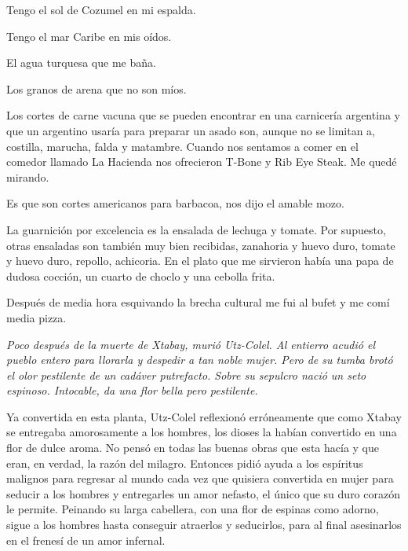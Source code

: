 \documentclass[12pt,twoside,openright,a5paper]{book}
\begin{document}
\vspace{0.5cm}

Tengo el sol de Cozumel en mi espalda.

Tengo el mar Caribe en mis oídos.

El agua turquesa que me baña.

Los granos de arena que no son míos.

\vspace{0.5cm}

\hrulefill\hspace{0.2cm} \decofourleft\decofourright \hspace{0.2cm} \hrulefill
\vspace{0.5cm}

Los cortes de carne vacuna que se pueden encontrar en una carnicería
argentina y que un argentino usaría para preparar un asado son, aunque
no se limitan a, costilla, marucha, falda y matambre. Cuando nos sentamos
a comer en el comedor llamado La Hacienda nos ofrecieron T-Bone y Rib Eye
Steak. Me quedé mirando.

Es que son cortes americanos para barbacoa, nos dijo el amable mozo.

La guarnición por excelencia es la ensalada de lechuga y tomate. Por
supuesto, otras ensaladas son también muy bien recibidas, zanahoria y huevo
duro, tomate y huevo duro, repollo, achicoria. En el plato que me sirvieron
había una papa de dudosa cocción, un cuarto de choclo y una cebolla frita.

Después de media hora esquivando la brecha cultural me fui al bufet y me
comí media pizza.

\vspace{0.5cm}

\hrulefill\hspace{0.2cm} \decofourleft\decofourright \hspace{0.2cm} \hrulefill
\vspace{0.5cm}

{\em Poco después de la muerte de Xtabay, murió Utz-Colel. Al entierro
acudió el pueblo entero para llorarla y despedir a tan noble mujer. Pero de su
tumba brotó el olor pestilente de un cadáver putrefacto. Sobre su sepulcro
nació un seto espinoso. Intocable, da una flor bella pero pestilente.

Ya convertida en esta planta, Utz-Colel reflexionó erróneamente que como
Xtabay se entregaba amorosamente a los hombres, los dioses la habían
convertido en una flor de dulce aroma. No pensó en todas las buenas obras
que esta hacía y que eran, en verdad, la razón del milagro. Entonces pidió
ayuda a los espíritus malignos para  regresar al mundo cada vez que quisiera
convertida en mujer para seducir a los hombres y entregarles un amor nefasto,
el único que su duro corazón le permite. Peinando su larga cabellera, con
una flor de espinas como adorno, sigue a los hombres hasta conseguir atraerlos
y seducirlos, para al final asesinarlos en el frenesí de un amor infernal.}
\end{document}

